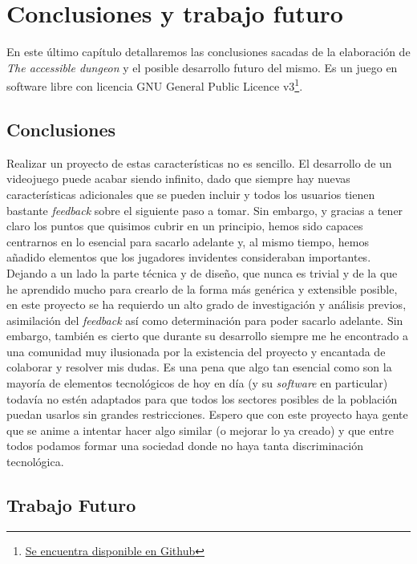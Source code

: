 \chapter{Conclusiones y trabajo futuro}

En este último capítulo detallaremos las conclusiones sacadas de la elaboración de \textit{The accessible dungeon} y el posible desarrollo futuro del mismo. Es un juego en software libre con licencia GNU General Public Licence v3\footnote{\href{https://github.com/dpenas/roomsgame}{Se encuentra disponible en Github}}.

\section{Conclusiones}

Realizar un proyecto de estas características no es sencillo. El desarrollo de un videojuego puede acabar siendo infinito, dado que siempre hay nuevas características adicionales que se pueden incluir y todos los usuarios tienen bastante \textit{feedback} sobre el siguiente paso a tomar. Sin embargo, y gracias a tener claro los puntos que quisimos cubrir en un principio, hemos sido capaces centrarnos en lo esencial para sacarlo adelante y, al mismo tiempo, hemos añadido elementos que los jugadores invidentes consideraban importantes.
Dejando a un lado la parte técnica y de diseño, que nunca es trivial y de la que he aprendido mucho para crearlo de la forma más genérica y extensible posible, en este proyecto se ha requierdo un alto grado de investigación y análisis previos, asimilación del \textit{feedback} así como determinación para poder sacarlo adelante. Sin embargo, también es cierto que durante su desarrollo siempre me he encontrado a una comunidad muy ilusionada por la existencia del proyecto y encantada de colaborar y resolver mis dudas.
Es una pena que algo tan esencial como son la mayoría de elementos tecnológicos de hoy en día (y su \textit{software} en particular) todavía no estén adaptados para que todos los sectores posibles de la población puedan usarlos sin grandes restricciones. Espero que con este proyecto haya gente que se anime a intentar hacer algo similar (o mejorar lo ya creado) y que entre todos podamos formar una sociedad donde no haya tanta discriminación tecnológica.

\section{Trabajo Futuro}

